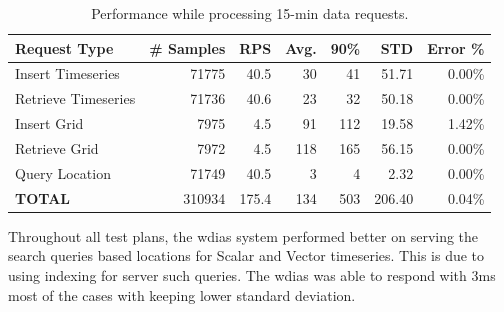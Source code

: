 \documentclass[conference]{IEEEtran}
\begin{document}
\begin{table}[tb!]
\caption{Performance while processing 15-min data requests.}
\begin{center}
\begin{adjustbox}{width=0.45\textwidth}
\begin{tabular}{|l|r|r|r|r|r|r|}
\hline
\textbf{Request Type} & \textbf{\# Samples} & \textbf{RPS} & \textbf{Avg.} & \textbf{90\%} & \textbf{STD} & \textbf{Error \%} \\ \hline
Insert Timeseries & 71775 & 40.5 & 30 & 41 & 51.71 & 0.00\%  \\ \hline
Retrieve Timeseries & 71736 & 40.6 & 23 & 32 & 50.18 & 0.00\%  \\ \hline
Insert Grid & 7975 & 4.5 & 91 & 112 & 19.58 & 1.42\% \\ \hline
Retrieve Grid & 7972 & 4.5 & 118 & 165 & 56.15 & 0.00\% \\ \hline
Query Location & 71749 & 40.5 & 3 & 4 & 2.32 & 0.00\% \\ \hline
\textbf{TOTAL} & 310934 & 175.4 & 134 & 503 & 206.40 & 0.04\% \\ \hline
\end{tabular}
\end{adjustbox}
\label{ptab:obs_all_15_min_summary_throughput}
\end{center}
\end{table}

Throughout all test plans, the \acrshort{wdias} system performed better on serving the search queries based locations for Scalar and Vector timeseries. This is due to using indexing for server such queries. The \acrshort{wdias} was able to respond with 3ms most of the cases with keeping lower standard deviation.
\end{document}
